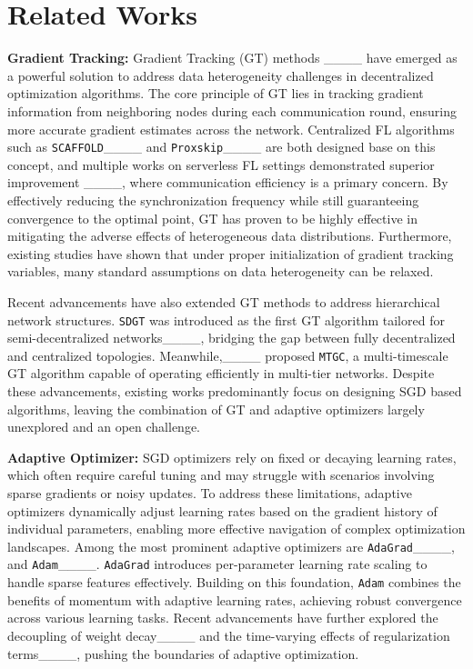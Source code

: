 \section{Related Works}
\textbf{Gradient Tracking:} Gradient Tracking (GT) methods ____ have emerged as a powerful solution to address data heterogeneity challenges in decentralized optimization algorithms. The core principle of GT lies in tracking gradient information from neighboring nodes during each communication round, ensuring more accurate gradient estimates across the network. Centralized FL algorithms such as {\tt SCAFFOLD}____ and {\tt Proxskip}____ are both designed base on this concept, and multiple works on serverless FL settings demonstrated superior improvement ____, where communication efficiency is a primary concern. By effectively reducing the synchronization frequency while still guaranteeing convergence to the optimal point, GT has proven to be highly effective in mitigating the adverse effects of heterogeneous data distributions. Furthermore, existing studies have shown that under proper initialization of gradient tracking variables, many standard assumptions on data heterogeneity can be relaxed.

Recent advancements have also extended GT methods to address hierarchical network structures. {\tt SDGT} was introduced as the first GT algorithm tailored for semi-decentralized networks____, bridging the gap between fully decentralized and centralized topologies. Meanwhile,____ proposed {\tt MTGC}, a multi-timescale GT algorithm capable of operating efficiently in multi-tier networks. 
Despite these advancements, existing works predominantly focus on designing SGD based algorithms, leaving the combination of GT and adaptive optimizers largely unexplored and an open challenge.

\textbf{Adaptive Optimizer:} SGD optimizers rely on fixed or decaying learning rates, which often require careful tuning and may struggle with scenarios involving sparse gradients or noisy updates. To address these limitations, adaptive optimizers dynamically adjust learning rates based on the gradient history of individual parameters, enabling more effective navigation of complex optimization landscapes. Among the most prominent adaptive optimizers are {\tt AdaGrad}____, and {\tt Adam}____. {\tt AdaGrad} introduces per-parameter learning rate scaling to handle sparse features effectively. Building on this foundation, {\tt Adam} combines the benefits of momentum with adaptive learning rates, achieving robust convergence across various learning tasks. Recent advancements have further explored the decoupling of weight decay____ and the time-varying effects of regularization terms____, pushing the boundaries of adaptive optimization.


